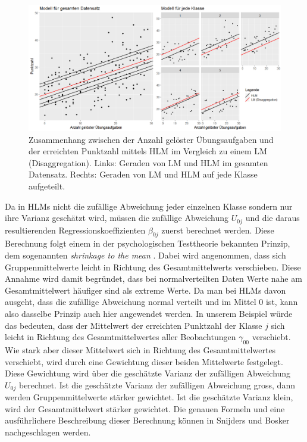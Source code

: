 \documentclass[12pt]{article}\usepackage[]{graphicx}\usepackage[]{color}
\begin{document}
\begin{figure}[ht!]
\centering
\includegraphics[width = \textwidth]{./figures/random_intercept}
\caption{Zusammenhang zwischen der Anzahl gelöster Übungsaufgaben und der erreichten Punktzahl mittels HLM im Vergleich zu einem LM (Disaggregation). Links: Geraden von LM und HLM im gesamten Datensatz. Rechts: Geraden von LM und HLM auf jede Klasse aufgeteilt.}
\label{fig:random_intercept}
\end{figure}

Da in HLMs nicht die zufällige Abweichung jeder einzelnen Klasse sondern nur ihre Varianz geschätzt wird, müssen die zufällige Abweichung $U_{0j}$ und die daraus resultierenden Regressionskoeffizienten $\beta_{0j}$ zuerst berechnet werden. Diese Berechnung folgt einem in der psychologischen Testtheorie bekannten Prinzip, dem sogenannten \textit{shrinkage to the mean} \citep{SnijdersTomA.B2012Ma:a}. Dabei wird angenommen, dass sich Gruppenmittelwerte leicht in Richtung des Gesamtmittelwerts verschieben. Diese Annahme wird damit begründet, dass bei normalverteilten Daten Werte nahe am Gesamtmittelwert häufiger sind als extreme Werte. Da man bei HLMs davon ausgeht, dass die zufällige Abweichung normal verteilt und im Mittel 0 ist, kann also dasselbe Prinzip auch hier angewendet werden. In unserem Beispiel würde das bedeuten, dass der Mittelwert der erreichten Punktzahl der Klasse $j$ sich leicht in Richtung des Gesamtmittelwertes aller Beobachtungen $\gamma_{00}$ verschiebt. Wie stark aber dieser Mittelwert sich in Richtung des Gesamtmittelwertes verschiebt, wird durch eine Gewichtung dieser beiden Mittelwerte festgelegt. Diese Gewichtung wird über die geschätzte Varianz der zufälligen Abweichung $U_{0j}$ berechnet. Ist die geschätzte Varianz der zufälligen Abweichung gross, dann werden Gruppenmittelwerte stärker gewichtet. Ist die geschätzte Varianz klein, wird der Gesamtmittelwert stärker gewichtet. Die genauen Formeln und eine ausführlichere Beschreibung dieser Berechnung können in Snijders und Bosker \citeyearpar[][Abschnitt 4.8]{SnijdersTomA.B2012Ma:a} nachgeschlagen werden.
\end{document}

